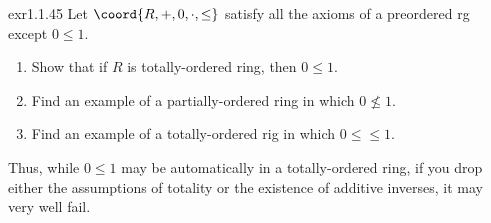 \begin{exr}{}{exr1.1.45}
Let $\coord{R,+,0,\cdot ,\leq}$ satisfy all the axioms of a preordered rg except $0\leq 1$.
\begin{enumerate}
\item Show that if $R$ is totally-ordered ring, then $0\leq 1$.
\item Find an example of a partially-ordered ring in which $0\not \leq 1$.
\item Find an example of a totally-ordered rig in which $0\leq \leq 1$.
\end{enumerate}
\begin{rmk}
Thus, while $0\leq 1$ may be automatically in a totally-ordered ring, if you drop either the assumptions of totality or the existence of additive inverses, it may very well fail.
\end{rmk}
\end{exr}

